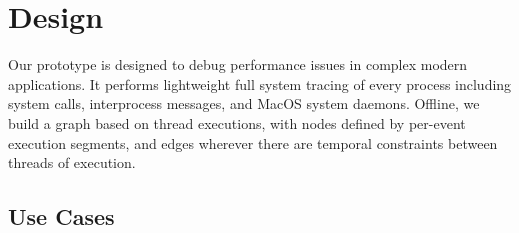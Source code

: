 \section{Design}
\label{sec:design}

Our \xxx prototype is designed to debug performance issues in complex modern applications.
It performs lightweight full system tracing of every process including system calls, interprocess messages, and MacOS system daemons.
Offline, we build a graph based on thread executions, with nodes defined by per-event execution segments, and edges wherever there are temporal constraints between threads of execution.

\subsection{Use Cases}

